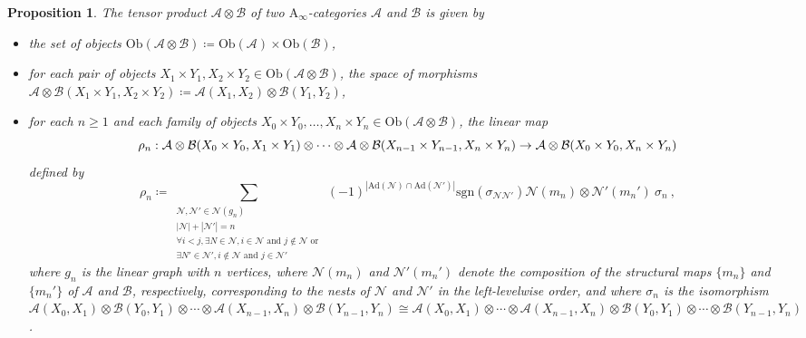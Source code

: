 \documentclass[twoside, 12pt]{amsart}
\newtheorem{proposition}[definition]{Proposition}
\theoremstyle{remark}
\newcommand{\cat}[1]{\mathcal{#1}}
\begin{document}
\begin{proposition} The \emph{tensor product} $\cat{A}\otimes \cat{B}$ of two $\mathrm{A}_\infty$-categories $\cat{A}$ and $\cat{B}$ is given by 
\begin{itemize}
  \item the set of objects $\mathrm{Ob}(\cat{A}\otimes \cat{B})\coloneqq \mathrm{Ob}(\cat{A})\times\mathrm{Ob}(\cat{B})$,
  \item for each pair of objects $X_1\times Y_1,X_2\times Y_2 \in \mathrm{Ob}(\cat{A}\otimes \cat{B})$, the space of morphisms $\cat{A}\otimes \cat{B}(X_1\times Y_1,X_2\times Y_2)\coloneqq \cat{A}(X_1,X_2)\otimes\cat{B}(Y_1,Y_2)$,
  \item for each $n\geq 1$ and each family of objects $X_0\times Y_0,\ldots,X_n\times Y_n \in \mathrm{Ob}(\cat{A}\otimes \cat{B})$, the linear map 
  \begin{equation*}
  \rho_n : \cat{A}\otimes \cat{B}(X_0\times Y_0,X_1\times Y_1) \otimes  \cdots  \otimes \cat{A}\otimes \cat{B}(X_{n-1}\times Y_{n-1},X_n\times Y_n) \\ 
   \to \cat{A}\otimes \cat{B}(X_0\times Y_0,X_n\times Y_n) 
\end{equation*} 
defined by 
\[\rho_n \coloneqq 
\sum_{\substack{
  \mathcal{N},\mathcal{N}' \in \mathcal{N}(g_n) \\ 
  |\mathcal{N}|+|\mathcal{N}'|=n \\
  \forall i<j, \exists N \in \mathcal{N}, i \in \mathcal{N} \text{ and } j \notin \mathcal{N} \text{ or } \\
  \exists N' \in \mathcal{N}', i \notin \mathcal{N} \text{ and } j \in \mathcal{N}'
}}
(-1)^{|\mathrm{Ad}(\mathcal{N})\cap \mathrm{Ad}(\mathcal{N}')|}\mathrm{sgn}(\sigma_{\mathcal{N}\mathcal{N}'})\mathcal{N}(m_n)\otimes \mathcal{N}'(m_n') \ \sigma_n \ ,\] 
where $g_n$ is the linear graph with $n$ vertices, where $\mathcal{N}(m_n)$ and $\mathcal{N}'(m_n')$ denote the composition of the structural maps $\{m_n\}$ and $\{m_n'\}$ of $\cat{A}$ and $\cat{B}$, respectively, corresponding to the nests of $\mathcal{N}$ and $\mathcal{N}'$ in the left-levelwise order, and where $\sigma_n$ is the isomorphism $\cat{A}(X_0,X_1)\otimes\cat{B}(Y_0,Y_1) \otimes \cdots \otimes \cat{A}(X_{n-1},X_n)\otimes\cat{B}(Y_{n-1},Y_n) \cong \cat{A}(X_0,X_1) \otimes \cdots \otimes \cat{A}(X_{n-1},X_n) \otimes \cat{B}(Y_0,Y_1) \otimes \cdots \otimes \cat{B}(Y_{n-1},Y_n)$.
\end{itemize}
\end{proposition}
\end{document}
